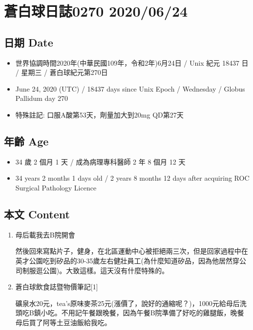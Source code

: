 \documentclass[a5paper, 11pt
]{book}
\providecommand{\tightlist}{%
  \setlength{\itemsep}{0pt}\setlength{\parskip}{0pt}}
\begin{document}
\hypertarget{ux84bcux767dux7403ux65e5ux8a8c0270-20200624}{%
\section{蒼白球日誌0270
2020/06/24}\label{ux84bcux767dux7403ux65e5ux8a8c0270-20200624}}

\hypertarget{ux65e5ux671f-date-21}{%
\subsection{日期 Date}\label{ux65e5ux671f-date-21}}

\begin{itemize}
\tightlist
\item
  世界協調時間2020年(中華民國109年，令和2年)6月24日 / Unix 紀元 18437 日
  / 星期三 / 蒼白球紀元第270日
\item
  June 24, 2020 (UTC) / 18437 days since Unix Epoch / Wednesday / Globus
  Pallidum day 270
\item
  特殊註記: 口服A酸第53天，劑量加大到20mg QD第27天
\end{itemize}

\hypertarget{ux5e74ux9f61-age-21}{%
\subsection{年齡 Age}\label{ux5e74ux9f61-age-21}}

\begin{itemize}
\tightlist
\item
  34 歲 2 個月 1 天 / 成為病理專科醫師 2 年 8 個月 12 天
\item
  34 years 2 months 1 days old / 2 years 8 months 12 days after
  acquiring ROC Surgical Pathology Licence
\end{itemize}

\hypertarget{ux672cux6587-content-21}{%
\subsection{本文 Content}\label{ux672cux6587-content-21}}

\begin{enumerate}
\def\labelenumi{\arabic{enumi}.}
\item
  母后載我去B院開會

  然後回來寫點片子，健身，在北區運動中心被拒絕兩三次，但是回家過程中在英才公園吃到矽品的30-35歲左右健壯員工(為什麼知道矽品，因為他居然穿公司制服逛公園)。大致這樣。這天沒有什麼特殊的。
\item
  蒼白球飲食誌暨物價筆記{[}1{]}

  礦泉水20元，tea's原味麥茶25元(漲價了，說好的通縮呢？)，1000元給母后洗頭吃B鎮小吃。不用記午餐跟晚餐，因為午餐B院準備了好吃的雞腿飯，晚餐母后買了阿等土豆油飯給我吃。
\end{enumerate}
\end{document}
